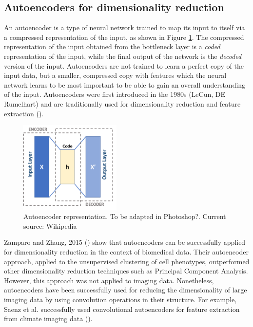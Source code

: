 \subsection{Autoencoders for dimensionality reduction}

An autoencoder is a type of neural network trained to map its input to itself via a compressed representation of the input, as shown in Figure \ref{fig:autoencoder}. The compressed representation of the input obtained from the bottleneck layer is a \textit{coded} representation of the input, while the final output of the network is the \textit{decoded} version of the input. Autoencoders are not trained to learn a perfect copy of the input data, but a smaller, compressed copy with features which the neural network learns to be most important to be able to gain an overall understanding of the input. Autoencoders were first introduced in the 1980s (LeCun, DE Rumelhart) and are traditionally used for dimensionality reduction and feature extraction (\cite{http://www.deeplearningbook.org/contents/autoencoders.html}).

\begin{figure}[h!]
    \centering
    \includegraphics[width=0.45\textwidth]{dissertation/figures/autoencoder_schema.png}
    \caption{Autoencoder representation. To be adapted in Photoshop?. Current source: Wikipedia}
    \label{fig:autoencoder}
\end{figure}

Zamparo and Zhang, 2015 (\cite{https://arxiv.org/pdf/1501.01348.pdf}) show that autoencoders can be successfully applied for dimensionality reduction in the context of biomedical data. Their autoencoder approach, applied to the unsupervised clustering of cell phenotypes, outperformed other dimensionality reduction techniques such as Principal Component Analysis. However, this approach was not applied to imaging data. Nonetheless, autoencoders have been successfully used for reducing the dimensionality of large imaging data by using convolution operations in their structure. For example, Saenz et al. successfully used convolutional autoencoders for feature extraction from climate imaging data (\cite{http://arxiv.org/abs/1809.00027}). %

